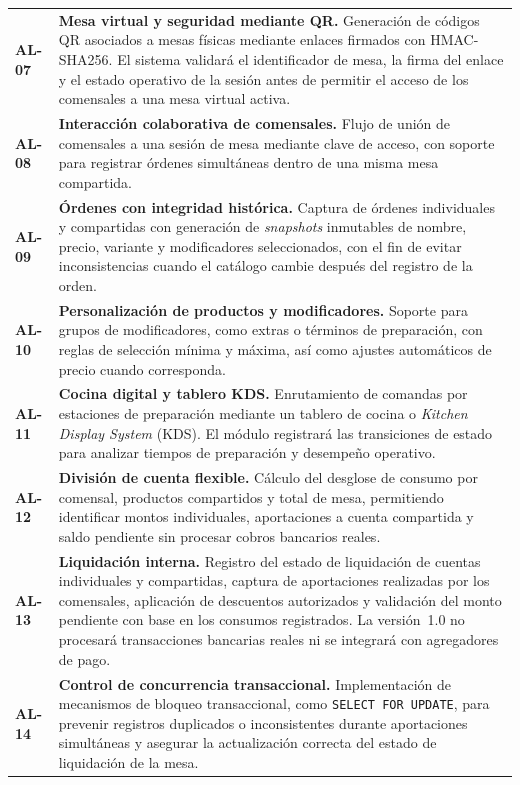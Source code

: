 {\begin{longtable}{>{\bfseries\centering}p{1.5cm} p{12.5cm}}
AL-07 & \textbf{Mesa virtual y seguridad mediante QR.} Generación de códigos QR asociados a mesas físicas mediante enlaces firmados con HMAC-SHA256. El sistema validará el identificador de mesa, la firma del enlace y el estado operativo de la sesión antes de permitir el acceso de los comensales a una mesa virtual activa. \\
\rowcolor{altrow}
AL-08 & \textbf{Interacción colaborativa de comensales.} Flujo de unión de comensales a una sesión de mesa mediante clave de acceso, con soporte para registrar órdenes simultáneas dentro de una misma mesa compartida. \\
AL-09 & \textbf{Órdenes con integridad histórica.} Captura de órdenes individuales y compartidas con generación de \textit{snapshots} inmutables de nombre, precio, variante y modificadores seleccionados, con el fin de evitar inconsistencias cuando el catálogo cambie después del registro de la orden. \\
\rowcolor{altrow}
AL-10 & \textbf{Personalización de productos y modificadores.} Soporte para grupos de modificadores, como extras o términos de preparación, con reglas de selección mínima y máxima, así como ajustes automáticos de precio cuando corresponda. \\
AL-11 & \textbf{Cocina digital y tablero KDS.} Enrutamiento de comandas por estaciones de preparación mediante un tablero de cocina o \textit{Kitchen Display System} (KDS). El módulo registrará las transiciones de estado para analizar tiempos de preparación y desempeño operativo. \\
\rowcolor{altrow}
AL-12 & \textbf{División de cuenta flexible.} Cálculo del desglose de consumo por comensal, productos compartidos y total de mesa, permitiendo identificar montos individuales, aportaciones a cuenta compartida y saldo pendiente sin procesar cobros bancarios reales. \\
AL-13 & \textbf{Liquidación interna.} Registro del estado de liquidación de cuentas individuales y compartidas, captura de aportaciones realizadas por los comensales, aplicación de descuentos autorizados y validación del monto pendiente con base en los consumos registrados. La versión~1.0 no procesará transacciones bancarias reales ni se integrará con agregadores de pago. \\
\rowcolor{altrow}
AL-14 & \textbf{Control de concurrencia transaccional.} Implementación de mecanismos de bloqueo transaccional, como \texttt{SELECT FOR UPDATE}, para prevenir registros duplicados o inconsistentes durante aportaciones simultáneas y asegurar la actualización correcta del estado de liquidación de la mesa. \\

\end{longtable}}
